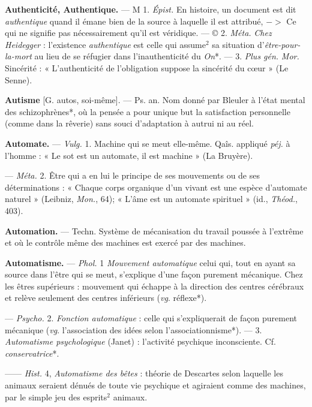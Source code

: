 \begin{itemize}[leftmargin=1cm, label=, itemsep=1pt]
{\item {\bf Authenticité, Authentique.} — M 1. \textsf{\textit {Épist.}}
En histoire, un document est dit
{\it authentique} quand il émane bien de
la source à laquelle il est attribué,
$->$ Ce qui ne signifie pas nécessairement qu'il est véridique. — © 2.
\textsf{\textit {Méta.}} {\it Chez Heidegger} : l'existence
{\it authentique} est celle qui assume$^2$
sa situation d'{\it être-pour-la-mort} au
lieu de se réfugier dans l’inauthenticité du {\it On}*. — 3. {\it Plus gén.} \textsf{\textit {Mor.}}
Sincérité : « L’authenticité de l’obligation suppose la sincérité du cœur »
(Le Senne).

\item {\bf Autisme} [G. autos, soi-même]. — Ps.
an. Nom donné par Bleuler à l’état
mental des schizophrènes*, où la
pensée a pour unique but la satisfaction personnelle (comme dans la
rêverie) sans souci d'adaptation à
autrui ni au réel.

\item {\bf Automate.} — \textsf{\textit {Vulg.}} 1. Machine qui se
meut elle-même. Qaîs. appliqué {\it péj.}
à l’homme : « Le sot est un automate,
il est machine » (La Bruyère).

— \textsf{\textit {Méta.}} 2. Être qui a en lui le
principe de ses mouvements ou de
ses déterminations : « Chaque corps
organique d’un vivant est une espèce
d’automate naturel » (Leibniz, {\it Mon.},
64); « L'âme est un automate spirituel » (id., {\it Théod.}, 403).

\item {\bf Automation.} — Techn. Système de
mécanisation du travail poussée à
l'extrême et où le contrôle même
des machines est exercé par des
machines.

\item {\bf Automatisme.} — \textsf{\textit {Phol.}} 1 {\it Mouvement
automatique} celui qui, tout en
ayant sa source dans l'être qui se
meut, s'explique d’une façon purement mécanique. Chez les êtres
supérieurs : mouvement qui échappe
à la direction des centres cérébraux
et relève seulement des centres inférieurs ({\it vg}. réflexe*).

— \textsf{\textit {Psycho.}} 2. {\it Fonction automatique} : celle qui s’expliquerait de
façon purement mécanique ({\it vg}. l’association des idées selon
l’associationnisme*). — 3. {\it Automatisme psychologique} (Janet) :
l’activité psychique inconsciente. Cf. {\it conservatrice}*.

—— \textsf{\textit {Hist.}} 4, {\it Automatisme des bêtes} :
théorie de Descartes selon laquelle
les animaux seraient dénués de toute
vie psychique et agiraient comme
des machines, par le simple jeu des
esprits$^2$ animaux.

}
\end{itemize}
